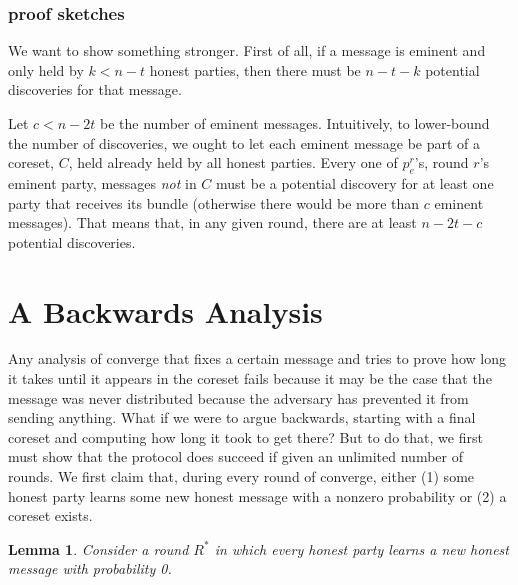 \documentclass{article}
\newtheorem{lemma}{Lemma}
\begin{document}
\subsubsection{proof sketches}

We want to show something stronger. First of all, if a message is eminent and only held by $k < n - t$ honest parties, then there must be $n - t - k$ potential discoveries for that message.

Let $c < n - 2t$ be the number of eminent messages. Intuitively, to lower-bound the number of discoveries, we ought to let each eminent message be part of a coreset, $C$, held already held by all honest parties. Every one of $p_e^r$'s, round $r$'s eminent party, messages \emph{not} in $C$ must be a potential discovery for at least one party that receives its bundle (otherwise there would be more than $c$ eminent messages). That means that, in any given round, there are at least $n - 2t - c$ potential discoveries.

\section{A Backwards Analysis}
Any analysis of converge that fixes a certain message and tries to prove how long it takes until it appears in the coreset fails because it may be the case that the message was never distributed because the adversary has prevented it from sending anything. What if we were to argue backwards, starting with a final coreset and computing how long it took to get there? But to do that, we first must show that the protocol does succeed if given an unlimited number of rounds. We first claim that, during every round of converge, either (1) some honest party learns some new honest message with a nonzero probability or (2) a coreset exists.

\begin{lemma}
Consider a round $R^*$ in which every honest party learns a new honest message with probability 0.
\end{lemma}
\end{document}
